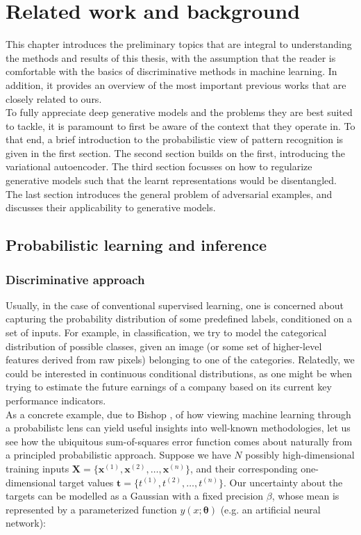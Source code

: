 \documentclass{report}
\begin{document}
\chapter{Related work and background}

This chapter introduces the preliminary topics that are integral to understanding the methods and results of this thesis, with the assumption that the reader is comfortable with the basics of discriminative methods in machine learning. In addition, it provides an overview of the most important previous works that are closely related to ours. \\

\noindent To fully appreciate deep generative models and the problems they are best suited to tackle, it is paramount to first be aware of the context that they operate in. To that end, a brief introduction to the probabilistic view of pattern recognition is given in the first section. The second section builds on the first, introducing the variational autoencoder. The third section focusses on how to regularize generative models such that the learnt representations would be disentangled. The last section introduces the general problem of adversarial examples, and discusses their applicability to generative models.

\section{Probabilistic learning and inference}

\subsection{Discriminative approach}

\noindent Usually, in the case of conventional supervised learning, one is concerned about capturing the probability distribution of some predefined labels, conditioned on a set of inputs. For example, in classification, we try to model the categorical distribution of possible classes, given an image (or some set of higher-level features derived from raw pixels) belonging to one of the categories. Relatedly, we could be interested in continuous conditional distributions, as one might be when trying to estimate the future earnings of a company based on its current key performance indicators. \\

\noindent As a concrete example, due to Bishop \cite{bishop-prml}, of how viewing machine learning through a probabilistc lens can yield useful insights into well-known methodologies, let us see how the ubiquitous sum-of-squares error function comes about naturally from a principled probabilistic approach. Suppose we have $N$ possibly high-dimensional training inputs $\mathbf{\boldsymbol{X}} = \{\boldsymbol{x}^{(1)}, \boldsymbol{x}^{(2)}, \dots, \boldsymbol{x}^{(n)}\}$, and their corresponding one-dimensional target values $\mathbf{t} = \{t^{(1)}, t^{(2)}, \dots, t^{(n)}\}$. Our uncertainty about the targets can be modelled as a Gaussian with a fixed precision $\beta$, whose mean is represented by a parameterized function $y(x; \boldsymbol{\theta})$ (e.g. an artificial neural network):
\end{document}
